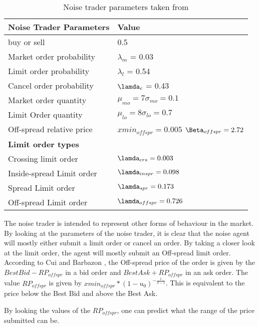 \begin{table}[h]
\centering
\begin{tabular}{ |m||p{4cm}|} 
\hline
\textbf{Noise Trader Parameters}& \textbf{Value} \\
\hline
\hline
buy or sell & 0.5 \\ 
\hline
Market order probability & $\lambda_{m}$ = 0.03\\ 
\hline
Limit order probability & $\lambda_{l}$ = 0.54\\ 
\hline
Cancel order probability & $\lamda_{c}$ = 0.43\\
\hline 
Market order quantity & $\mu_{mo} = 7 \sigma_{mo} = 0.1 $\\
\hline
Limit Order quantity &  $\mu_{lo} = 8 \sigma_{lo} = 0.7 $\\
\hline
Off-spread relative price & $xmin_{offspr} =0.005$ 
\newline 
$\Beta_{offspr} = 2.72 $\\
\hline
\textbf{Limit order types} & \\
\hline
Crossing limit order & $\lamda_{crs} = 0.003$\\
\hline 
Inside-spread Limit order & $\lamda_{inspr} = 0.098$\\
\hline 
Spread Limit order & $\lamda_{spr} = 0.173$\\
\hline 
Off-spread Limit order & $\lamda_{offspr} = 0.726$\\
\hline
\end{tabular}
\caption{Noise trader parameters taken from \cite{McGroarty}}
\end{table}
\FloatBarrier 

The noise trader is intended to represent other forms of behaviour in the market. By looking at the parameters of the noise trader, it is clear that the noise agent will mostly either submit a limit order or cancel an order. By taking a closer look at the limit order, the agent will mostly submit an Off-spread limit order. According to Cui and Barbazon \cite{CuiNoise}, the Off-spread price of the order is given by the $BestBid - RP_{offspr}$ in a bid order and $BestAsk + RP_{offspr}$ in an ask order. The value $RP_{offspr}$ is given by $xmin_{offspr} * (1-u_0)^{-\frac{1}{\beta - 1}}$. This is equivalent to the price below the Best Bid and above the Best Ask.

By looking the values of the $RP_{offspr}$, one can predict what the range of the price submitted can be. 

